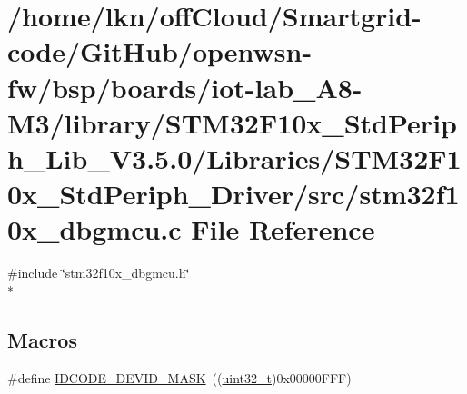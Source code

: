 \hypertarget{iot-lab___a8-_m3_2library_2_s_t_m32_f10x___std_periph___lib___v3_85_80_2_libraries_2_s_t_m32_f10ba93ee7a71923985da9845ebaad005d3}{}\section{/home/lkn/off\+Cloud/\+Smartgrid-\/code/\+Git\+Hub/openwsn-\/fw/bsp/boards/iot-\/lab\+\_\+\+A8-\/\+M3/library/\+S\+T\+M32\+F10x\+\_\+\+Std\+Periph\+\_\+\+Lib\+\_\+\+V3.5.0/\+Libraries/\+S\+T\+M32\+F10x\+\_\+\+Std\+Periph\+\_\+\+Driver/src/stm32f10x\+\_\+dbgmcu.c File Reference}
\label{iot-lab___a8-_m3_2library_2_s_t_m32_f10x___std_periph___lib___v3_85_80_2_libraries_2_s_t_m32_f10ba93ee7a71923985da9845ebaad005d3}
{\ttfamily \#include \char`\"{}stm32f10x\+\_\+dbgmcu.\+h\char`\"{}}\\*
\subsection*{Macros}
\begin{DoxyCompactItemize}
\item 
\#define \hyperlink{group___d_b_g_m_c_u___private___defines_gaeeece10cca80f3c632d3d77c3f2917b6}{I\+D\+C\+O\+D\+E\+\_\+\+D\+E\+V\+I\+D\+\_\+\+M\+A\+SK}~((\hyperlink{_p_e___types_8h_a33594304e786b158f3fb30289278f5af}{uint32\+\_\+t})0x00000\+F\+F\+F)
\end{DoxyCompactItemize}
